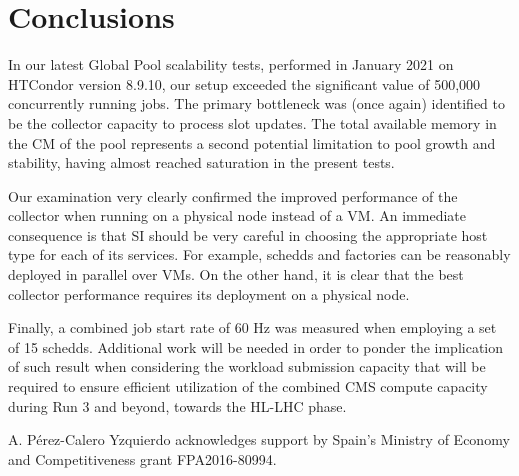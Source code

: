 \documentclass{webofc}
\begin{document}
\section{Conclusions}
\label{sec:conclusions}
In our latest Global Pool scalability tests, performed in January 2021 on HTCondor version 8.9.10, our setup exceeded the significant value of 500,000 concurrently running jobs. The primary bottleneck was (once again) identified to be the collector capacity to process slot updates. The total available memory in the CM of the pool represents a second potential limitation to pool growth and stability, having almost reached saturation in the present tests. 

Our examination very clearly confirmed the improved performance of the collector when running on a physical node instead of a VM. An immediate consequence is that SI should be very careful in choosing the appropriate host type for each of its services. For example, schedds and factories can be reasonably deployed in parallel over VMs. On the other hand, it is clear that the best collector performance requires its deployment on a physical node.

Finally, a combined job start rate of 60 Hz was measured when employing a set of 15 schedds. Additional work will be needed in order to ponder the implication of such result when considering the workload submission capacity that will be required to ensure efficient utilization of the combined CMS compute capacity during Run 3 and beyond, towards the HL-LHC phase.

A. P\'erez-Calero Yzquierdo acknowledges support by Spain’s Ministry of Economy and Competitiveness grant FPA2016-80994.
\end{document}

